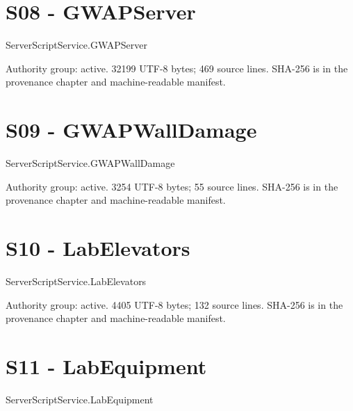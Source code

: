 \chapter{S08 - GWAPServer}
\label{src:S08}
ServerScriptService.\allowbreak{}GWAPServer

Authority group: active.\allowbreak{} 32199 UTF-8 bytes; 469 source lines.\allowbreak{} SHA-256 is in the provenance chapter and machine-readable manifest.\allowbreak{}

\begingroup{}
\endgroup
\chapter{S09 - GWAPWallDamage}
\label{src:S09}
ServerScriptService.\allowbreak{}GWAPWallDamage

Authority group: active.\allowbreak{} 3254 UTF-8 bytes; 55 source lines.\allowbreak{} SHA-256 is in the provenance chapter and machine-readable manifest.\allowbreak{}

\begingroup{}
\endgroup
\chapter{S10 - LabElevators}
\label{src:S10}
ServerScriptService.\allowbreak{}LabElevators

Authority group: active.\allowbreak{} 4405 UTF-8 bytes; 132 source lines.\allowbreak{} SHA-256 is in the provenance chapter and machine-readable manifest.\allowbreak{}

\begingroup{}
\endgroup
\chapter{S11 - LabEquipment}
\label{src:S11}
ServerScriptService.\allowbreak{}LabEquipment


